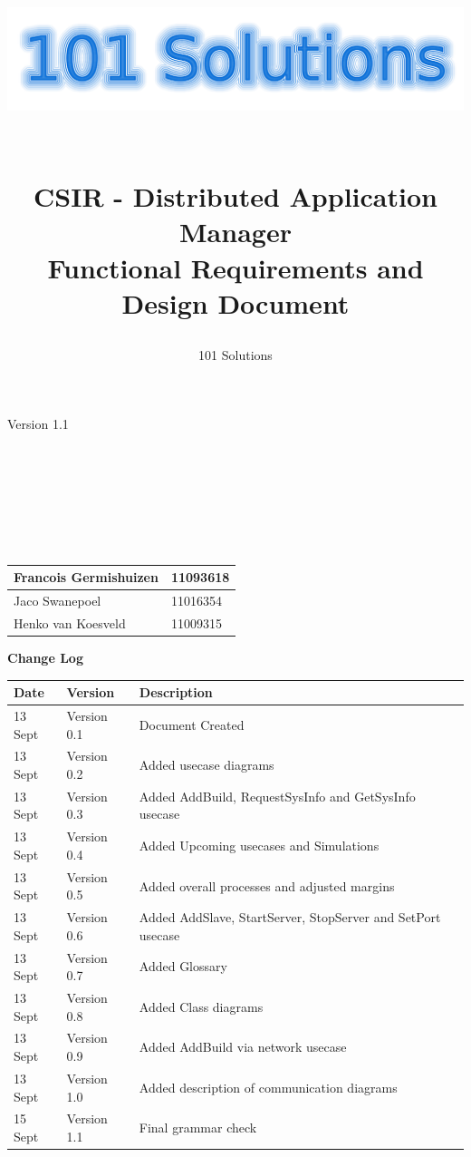 \documentclass[a4paper,12pt,final]{article}
\title{
\begin{center}
  	\includegraphics[scale=0.3]{101Logo.png} 
  \end{center}
  \textbf{\\}
CSIR - Distributed Application Manager\\
Functional Requirements and Design Document\\
}
\author{101 Solutions}
\begin{document}
\maketitle
\begin{center}
Version 1.1
\end{center}
\textbf{\\}
\textbf{\\}
\textbf{\\}
\textbf{\\}
\textbf{\\}
\textbf{\\}
\begin{center}
\begin{tabular}{|l|l|}
\hline
Francois Germishuizen & 11093618\\
\hline
Jaco Swanepoel & 11016354\\
\hline
Henko van Koesveld & 11009315\\
\hline
\end{tabular}
\end{center}
\thispagestyle{empty}
\newpage
\thispagestyle{empty}
\textbf{\large{Change Log}}
\vspace{6pt}\newline
\begin{tabular}{|l|l|l|}
\hline
Date & Version & Description\\
\hline
13 Sept & Version 0.1 & Document Created\\
\hline
13 Sept & Version 0.2 & Added usecase diagrams\\
\hline
13 Sept & Version 0.3 & Added AddBuild, RequestSysInfo and GetSysInfo usecase\\
\hline
13 Sept & Version 0.4 & Added Upcoming usecases and Simulations\\
\hline
13 Sept & Version 0.5 & Added overall processes and adjusted margins\\
\hline
13 Sept & Version 0.6 & Added AddSlave, StartServer, StopServer and SetPort usecase\\
\hline
13 Sept & Version 0.7 & Added Glossary\\
\hline
13 Sept & Version 0.8 & Added Class diagrams\\
\hline
13 Sept & Version 0.9 & Added AddBuild via network usecase\\
\hline
13 Sept & Version 1.0 & Added description of communication diagrams\\
\hline
15 Sept & Version 1.1 & Final grammar check\\
\hline
\end{tabular}
\newpage
\tableofcontents
\thispagestyle{empty}
\newpage
\end{document}
